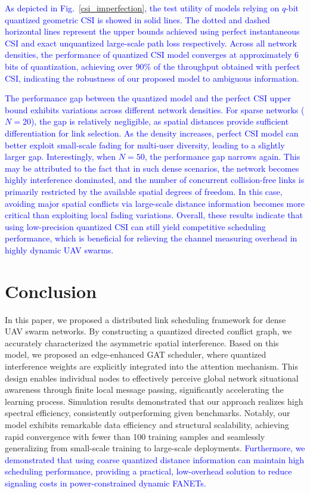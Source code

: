 \documentclass[journal]{IEEEtran}
\begin{document}
	\textcolor{blue}{As depicted in Fig.~\ref{csi_imperfection}, the test utility of models relying on $q$-bit quantized geometric CSI is showed in solid lines. The dotted and dashed horizontal lines represent the upper bounds achieved using perfect instantaneous CSI and exact unquantized large-scale path loss respectively. Across all network densities, the performance of quantized CSI model converges at approximately 6 bits of quantization, achieving over 90\% of the throughput obtained with perfect CSI, indicating the robustness of our proposed model to ambiguous information.}
	
	\textcolor{blue}{The performance gap between the quantized model and the perfect CSI upper bound exhibits variations across different network densities. For sparse networks ($N=20$), the gap is relatively negligible, as spatial distances provide sufficient differentiation for link selection. As the density increases, perfect CSI model can better exploit small-scale fading for multi-user diversity, leading to a slightly larger gap. Interestingly, when $N=50$, the performance gap narrows again. This may be attributed to the fact that in such dense scenarios, the network becomes highly interference dominated, and the number of concurrent collision-free links is primarily restricted by the available spatial degrees of freedom. In this case, avoiding major spatial conflicts via large-scale distance information becomes more critical than exploiting local fading variations. Overall, these results indicate that using low-precision quantized CSI can still yield competitive scheduling performance, which is beneficial for relieving the channel measuring overhead in highly dynamic UAV swarms.}
	
	\section{Conclusion}\label{s5}
	In this paper, we proposed a distributed link scheduling framework for dense UAV swarm networks. By constructing a quantized directed conflict graph, we accurately characterized the asymmetric spatial interference. Based on this model, we proposed an edge-enhanced GAT scheduler, where quantized interference weights are explicitly integrated into the attention mechanism. This design enables individual nodes to effectively perceive global network situational awareness through finite local message passing, significantly accelerating the learning process. Simulation results demonstrated that our approach realizes high spectral efficiency, consistently outperforming given benchmarks. Notably, our model exhibits remarkable data efficiency and structural scalability, achieving rapid convergence with fewer than 100 training samples and seamlessly generalizing from small-scale training to large-scale deployments. \textcolor{blue}{Furthermore, we demonstrated that using coarse quantized distance information can maintain high scheduling performance, providing a practical, low-overhead solution to reduce signaling costs in power-constrained dynamic FANETs.}
	
	
	
\end{document}
